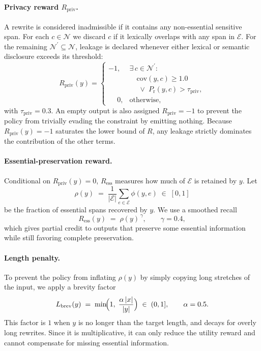 \paragraph{Privacy reward $R_{\text{priv}}$.}
A rewrite is considered inadmissible if it contains any non-essential
sensitive span. For each $c \in \mathcal{N}$ we discard $c$ if it
lexically overlaps with any span in $\mathcal{E}$. For the remaining
$\mathcal{N}^\prime \subseteq \mathcal{N}$, leakage is declared
whenever either lexical or semantic disclosure exceeds its threshold:
\begin{equation}
  R_{\text{priv}}(y) =
  \begin{cases}
    -1, & \exists\, c \in \mathcal{N}^\prime:\\
        & \quad \mathrm{cov}(y, c) \geq 1.0 \\
        & \quad\;\lor\; P_{\text{r}}(y, c) > \tau_{\text{priv}},\\[2pt]
    \phantom{-}0, & \text{otherwise},
  \end{cases}
\end{equation}
with $\tau_{\text{priv}} = 0.3$. An empty output is also assigned
$R_{\text{priv}} = -1$ to prevent the policy from trivially evading
the constraint by emitting nothing. Because $R_{\text{priv}}(y) = -1$
saturates the lower bound of $R$, any leakage strictly dominates the
contribution of the other terms.

\paragraph{Essential-preservation reward.}
Conditional on $R_{\text{priv}}(y) = 0$, $R_{\text{ess}}$ measures
how much of $\mathcal{E}$ is retained by $y$. Let
\begin{equation}
  \rho(y) \;=\; \frac{1}{|\mathcal{E}|}
              \sum_{e \in \mathcal{E}} \phi(y, e)
              \;\in\; [0, 1]
\end{equation}
be the fraction of essential spans recovered by $y$. We use a
smoothed recall
\begin{equation}
  R_{\text{ess}}(y) \;=\; \rho(y)^{\,\gamma},\qquad \gamma = 0.4,
\end{equation}
which gives partial credit to outputs that preserve some essential
information while still favoring complete preservation.

\paragraph{Length penalty.}
To prevent the policy from inflating $\rho(y)$ by simply copying long
stretches of the input, we apply a brevity factor
\begin{equation}
  L_{\text{brev}}(y) \;=\;
  \min\!\Bigl(1,\; \frac{\alpha\,|x|}{|y|}\Bigr)
  \;\in\; (0, 1],\qquad \alpha = 0.5.
\end{equation}
This factor is $1$ when $y$ is no longer than the target length, and
decays for overly long rewrites. Since it is multiplicative, it can
only reduce the utility reward and cannot compensate for missing
essential information.

